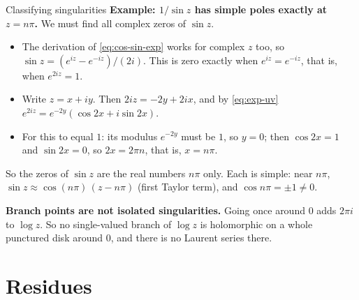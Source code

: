\documentclass[11pt]{beamer}
\begin{document}
\begin{frame}[allowframebreaks=1.00]{Classifying singularities}
\textbf{Example: \(1/\sin z\) has simple poles exactly at \(z=n\pi\).} We must find all complex zeros of
\(\sin z\).
\begin{itemize}
  \item The derivation of \eqref{eq:cos-sin-exp} works for complex \(z\) too, so
        \(\sin z=(e^{iz}-e^{-iz})/(2i)\). This is zero exactly when \(e^{iz}=e^{-iz}\), that is, when
        \(e^{2iz}=1\).
  \item Write \(z=x+iy\). Then \(2iz=-2y+2ix\), and by \eqref{eq:exp-uv}
        \(e^{2iz}=e^{-2y}(\cos2x+i\sin2x)\).
  \item For this to equal \(1\): its modulus \(e^{-2y}\) must be \(1\), so \(y=0\); then \(\cos2x=1\) and
        \(\sin2x=0\), so \(2x=2\pi n\), that is, \(x=n\pi\).
\end{itemize}
So the zeros of \(\sin z\) are the real numbers \(n\pi\) only. Each is simple: near \(n\pi\),
\(\sin z\approx\cos(n\pi)\,(z-n\pi)\) (first Taylor term), and \(\cos n\pi=\pm1\ne0\).

\textbf{Branch points are not isolated singularities.} Going once around \(0\) adds \(2\pi i\) to
\(\log z\). So no single-valued branch of \(\log z\) is holomorphic on a whole punctured disk around
\(0\), and there is no Laurent series there.

\end{frame}

\section{Residues}
\end{document}
